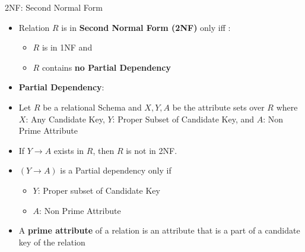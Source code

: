 \documentclass[aspectratio=169, xcolor=dvipsnames]{beamer}
\begin{document}
\begin{frame}{2NF: Second Normal Form}
    \begin{itemize}[<+->]
        \item Relation $R$ is in \textbf{Second Normal Form (2NF)} only iff :
        \begin{itemize}
            \item[$\triangleright$] $R$ is in 1NF and
            \item[$\triangleright$] $R$ contains \textbf{no Partial Dependency}
        \end{itemize}
        \item \textbf{Partial Dependency}:
        \item Let $R$ be a relational Schema and $X, Y, A$ be the attribute sets over $R$ where $X$: Any Candidate Key, $Y$: Proper Subset of Candidate Key, and $A$: Non Prime Attribute
        \item If $Y \rightarrow A$ exists in $R$, then $R$ is not in 2NF.
        \item $(Y \rightarrow A)$ is a Partial dependency only if
        \begin{itemize}
            \item[$\triangleright$] $Y$: Proper subset of Candidate Key
            \item[$\triangleright$] $A$: Non Prime Attribute
        \end{itemize}
        \item A \textbf{prime attribute} of a relation is an attribute that is a part of a candidate key of the relation
    \end{itemize}
\end{frame}
\end{document}
